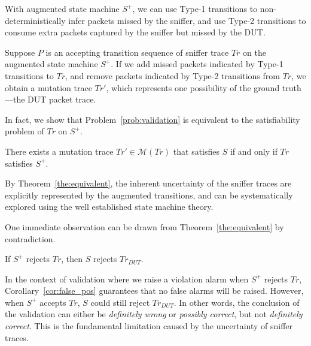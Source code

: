 With augmented state machine $S^+$, we can use Type-1 transitions to
non-deterministically infer packets missed by the sniffer, and use Type-2
transitions to consume extra
packets captured by the sniffer but missed by the DUT.

Suppose $P$ is an accepting transition sequence of sniffer trace $Tr$ on the
augmented state machine $S^+$. If we add missed packets indicated by Type-1
transitions to $Tr$, and remove packets indicated by Type-2 transitions from
$Tr$, we obtain a mutation trace $Tr'$, which represents one possibility of the
ground truth---the DUT packet trace.

In fact, we show that Problem~\ref{prob:validation} is equivalent to the
satisfiability problem of $Tr$ on $S^+$.

\begin{theorem}
  There exists a mutation trace $Tr' \in \mathcal{M}(Tr)$ that satisfies $S$ if
  and only if $Tr$ satisfies $S^+$.
 \label{the:equivalent}
\end{theorem}

By Theorem~\ref{the:equivalent}, the inherent uncertainty of the sniffer traces
are explicitly represented by the augmented transitions, and can be
systematically explored using the well established state machine theory.

One immediate observation can be drawn from Theorem~\ref{the:equivalent} by
contradiction.

\begin{corollary}
  If $S^+$ rejects $Tr$, then $S$ rejects $Tr_{DUT}$.
  \label{cor:false_pos}
\end{corollary}
In the context of validation where we raise a violation alarm when $S^+$
rejects $Tr$, Corollary~\ref{cor:false_pos} guarantees that no false alarms will be
raised.
However, when $S^+$ accepts $Tr$, $S$ could still reject $Tr_{DUT}$.
In other words, the conclusion of the validation can either be \textit{definitely
wrong} or \textit{possibly correct}, but not \textit{definitely correct}.
This is the fundamental limitation caused by the uncertainty of sniffer traces.

